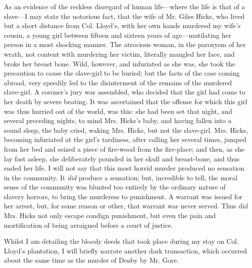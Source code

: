 As an evidence of the reckless disregard of human life---where the life
is that of a slave---I may state the notorious fact, that the wife of
Mr. Giles Hicks, who lived but a short distance from Col. Lloyd's, with
her own hands murdered my wife's cousin, a young girl between fifteen
and sixteen years of age---mutilating her person in a most shocking
manner. The atrocious woman, in the paroxysm of her wrath, not content
with murdering her victim, literally mangled her face, and broke her
breast bone. Wild, however, and infuriated as she was, she took the
precaution to cause the slave-girl to be buried; but the facts of the
case coming abroad, very speedily led to the disinterment of the remains
of the murdered slave-girl. A coroner's jury was assembled, who decided
that the girl had come to her death by severe beating. It was
ascertained that the offense for which this girl was thus hurried out of
the world, was this: she had been set that night, and several preceding
nights, to mind Mrs. Hicks's baby, and having fallen into a sound sleep,
the baby cried, waking Mrs. Hicks, but not the slave-girl. Mrs. Hicks,
becoming infuriated at the girl's tardiness, after calling her several
times, jumped from her bed and seized a piece of fire-wood from the
{}fire-place; and then, as she lay fast asleep, she deliberately pounded
in her skull and breast-bone, and thus ended her life. I will not say
that this most horrid murder produced no sensation in the community. It
\emph{did} produce a sensation; but, incredible to tell, the moral sense
of the community was blunted too entirely by the ordinary nature of
slavery horrors, to bring the murderess to punishment. A warrant was
issued for her arrest, but, for some reason or other, that warrant was
never served. Thus did Mrs. Hicks not only escape condign punishment,
but even the pain and mortification of being arraigned before a court of
justice.

Whilst I am detailing the bloody deeds that took place during my stay on
Col. Lloyd's plantation, I will briefly narrate another dark
transaction, which occurred about the same time as the murder of Denby
by Mr. Gore.

